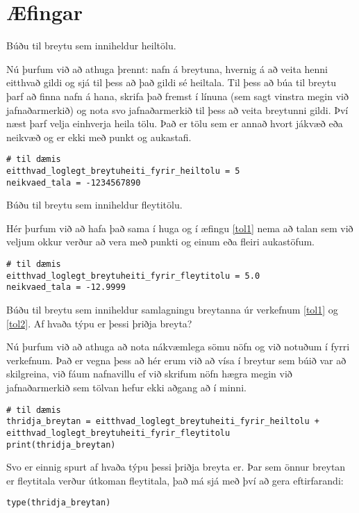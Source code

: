\newpage

\section{Æfingar}
\begin{exercise}\label{tol1}
		Búðu til breytu sem inniheldur heiltölu.
	\end{exercise}
	\begin{Answer}[ref={tol1}]
		Nú þurfum við að athuga þrennt: nafn á breytuna, hvernig á að veita henni eitthvað gildi og sjá til þess að það gildi sé heiltala.
		Til þess að búa til breytu þarf að finna nafn á hana, skrifa það fremst í línuna (sem sagt vinstra megin við jafnaðarmerkið) og nota svo jafnaðarmerkið til þess að veita breytunni gildi.
		Því næst þarf velja einhverja heila tölu.
		Það er tölu sem er annað hvort jákvæð eða neikvæð og er ekki með punkt og aukastafi.
\begin{lstlisting}
# til dæmis
eitthvad_loglegt_breytuheiti_fyrir_heiltolu = 5
neikvaed_tala = -1234567890\end{lstlisting}
\end{Answer}

\begin{exercise}\label{tol2}
	Búðu til breytu sem inniheldur fleytitölu.
\end{exercise}
\begin{Answer}[ref={tol2}]
	Hér þurfum við að hafa það sama í huga og í æfingu \ref{tol1} nema að talan sem við veljum okkur verður að vera með punkti og einum eða fleiri aukastöfum.
\begin{lstlisting}
# til dæmis
eitthvad_loglegt_breytuheiti_fyrir_fleytitolu = 5.0
neikvaed_tala = -12.9999\end{lstlisting}
\end{Answer}

\begin{exercise}\label{tol2-5}
	Búðu til breytu sem inniheldur samlagningu breytanna úr verkefnum \ref{tol1} og \ref{tol2}. Af hvaða týpu er þessi þriðja breyta?
\end{exercise}
\begin{Answer}[ref={tol2-5}]
	Nú þurfum við að athuga að nota nákvæmlega sömu nöfn og við notuðum í fyrri verkefnum.
	Það er vegna þess að hér erum við að vísa í breytur sem búið var að skilgreina, við fáum nafnavillu ef við skrifum nöfn hægra megin við jafnaðarmerkið sem tölvan hefur ekki aðgang að í minni.
\begin{lstlisting}
# til dæmis
thridja_breytan = eitthvad_loglegt_breytuheiti_fyrir_heiltolu + eitthvad_loglegt_breytuheiti_fyrir_fleytitolu
print(thridja_breytan)\end{lstlisting}
	Svo er einnig spurt af hvaða týpu þessi þriðja breyta er.
	Þar sem önnur breytan er fleytitala verður útkoman fleytitala, það má sjá með því að gera eftirfarandi:
	
\begin{lstlisting}
type(thridja_breytan)\end{lstlisting}
\end{Answer}


